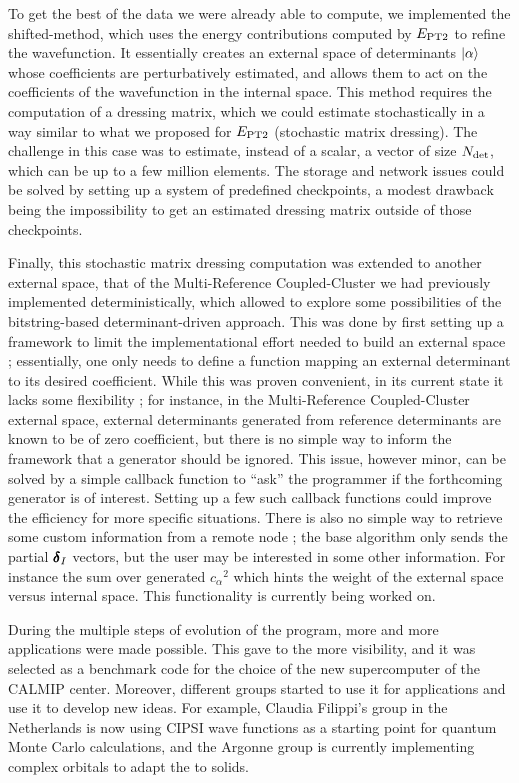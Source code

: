 \documentclass[12pt,a4paper]{report}
\begin{document}
To get the best of the data we were already able to compute, we implemented the shifted-\Bk method, which uses the energy contributions computed by $E_\text{PT2}$ to refine the wavefunction. It essentially creates an external space of determinants ${\ket{\alpha}}$ whose coefficients are perturbatively estimated, and allows them to act on the coefficients of the wavefunction in the internal space. This method requires the computation of a dressing matrix, which we could estimate stochastically in a way similar to what we proposed for $E_\text{PT2}$ (stochastic matrix dressing).
The challenge in this case was to estimate, instead of a scalar, a vector of size ${N_\text{det}}$, which can be up to a few million elements. The storage and network issues could be solved by setting up a system of predefined checkpoints, a modest drawback being the impossibility to get an estimated dressing matrix outside of those checkpoints.

Finally, this stochastic matrix dressing computation was extended to another external space, that of the Multi-Reference Coupled-Cluster we had previously implemented deterministically,\cite{Garniron_2017} which allowed to explore some possibilities of the bitstring-based determinant-driven approach.
This was done by first setting up a framework to limit the implementational
effort needed to build an external space ; essentially, one only needs to
define a function mapping an external determinant to its desired coefficient.
While this was proven convenient, in its current state it lacks some
flexibility ; for instance, in the Multi-Reference Coupled-Cluster external
space, external determinants generated from reference determinants are known to
be of zero coefficient, but there is no simple way to inform the framework that
a generator should be ignored. This issue, however minor, can be solved by a
simple callback function to ``ask'' the programmer if the forthcoming generator
is of
interest. Setting up a few such callback functions could improve the efficiency for
more specific situations. There is also no simple way to retrieve some custom
information from a remote node ; the base algorithm only sends the partial
$\pmb \delta_I$ vectors, but the user may be interested in some other
information. For instance the sum over generated ${c_\alpha}^2$ which hints
the weight of the external space versus internal space. This functionality is
currently being worked on.


During the multiple steps of evolution of the program, more and more
applications were made
possible.\cite{Loos_2018,Garniron_2018,Giner_2017,Garniron_2017,Garniron_2017b,Scemama_2018,1806.05115}
This gave to the \QP more visibility, and it was selected as a benchmark code
for the choice of the new supercomputer of the CALMIP center. Moreover,
different groups started to use it for applications and use it to develop new
ideas. For example, Claudia Filippi's group in the Netherlands is now using
CIPSI wave functions as a starting point for quantum Monte Carlo calculations,\cite{Dash_2018}
and the Argonne group is currently implementing complex orbitals to adapt the \QP
to solids.\cite{Benali_2018}
\end{document}
